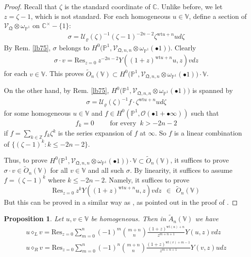 \documentclass[11pt,b5paper,notitlepage]{article}
\theoremstyle{definition}
\theoremstyle{plain}
\newtheorem{pp}[df]{Proposition}
\newcommand{\mc}{\mathcal}
\newcommand{\wtd}{\widetilde}
\newcommand{\Res}{\mathrm{Res}}
\newcommand{\SV}{\mathscr{V}}
\newcommand{\scr}{\mathscr}
\newcommand{\blt}{\bullet}
\newcommand{\Vbb}{\mathbb V}
\newcommand{\Cbb}{\mathbb C}
\newcommand{\Zbb}{\mathbb Z}
\newcommand{\Pbb}{\mathbb P}
\newcommand{\wt}{\mathrm{wt}}
\newcommand{\<}{\left\langle}
\renewcommand{\>}{\right\rangle}
\newcommand{\MU}{\mathcal{U}}
\newcommand{\fq}{{\mathfrak Q}}
\numberwithin{equation}{section}
\begin{document}
\begin{proof}
Recall that $\zeta$ is the standard coordinate of $\Cbb$. Unlike before, we let $z=\zeta-1$, which is not standard. For each homogeneous $u\in\Vbb$, define a section of $\scr V_\fq\otimes\omega_{\Pbb^1}$ on $\Cbb^\times-\{1\}$:
\begin{align}
\sigma=\MU_\varrho(\zeta)^{-1}(\zeta-1)^{-2n-2}\zeta^{\wt u+n}u d\zeta
\end{align}
By Rem. \ref{lb75}, $\sigma$ belongs to $H^0\big(\Pbb^1, \SV_{\fq,n,n}\otimes \omega_{\Pbb^1}(\bullet 1)\big)$. Clearly
\begin{align}
\sigma\cdot v=\Res_{z=0}~z^{-2n-2}Y((1+z)^{\wt u+n}u,z)vdz
\end{align}
for each $v\in\Vbb$. This proves $\wtd O_n(\Vbb)\subset H^0\big(\Pbb^1, \SV_{\fq,n,n}\otimes \omega_{\Pbb^1}(\bullet 1)\big)\cdot\Vbb$.



On the other hand, by Rem. \ref{lb75}, $H^0\big(\Pbb^1, \SV_{\fq,n,n}\otimes \omega_{\Pbb^1}(\bullet 1)\big)$ is spanned by
\begin{align*}
\sigma= \MU_\varrho(\zeta)^{-1} f\cdot\zeta^{\wt u+n}u d\zeta
\end{align*}
for some homogeneous $u\in \Vbb$ and $f\in H^0(\Pbb^1,\mc O(\blt 1+\blt\infty))$ such that 
\begin{align}
f_k=0\qquad \text{ for every } ~k>-2n-2
\end{align}
if $f=\sum_{k\in\Zbb}f_k\zeta^k$ is the series expansion of $f$ at $\infty$. So $f$ is a linear combination of $\{(\zeta-1)^k:k\leq -2n-2\}$. 

Thus, to prove $H^0\big(\Pbb^1, \SV_{\fq,n,n}\otimes \omega_{\Pbb^1}(\bullet 1)\big)\cdot\Vbb\subset\wtd O_n(\Vbb)$, it suffices to prove $\sigma\cdot v\in\wtd O_n(\Vbb)$ for all $v\in\Vbb$ and all such $\sigma$. By linearity, it suffices to assume $f=(\zeta-1)^k$ where $k\leq -2n-2$. Namely, it suffices to prove
    \begin{equation*}
    \Res_{z=0} ~z^k Y((1+z)^{\wt u+n}u,z)vdz ~~ \in ~~\wtd O_n(\Vbb)
    \end{equation*}
But this can be proved in a similar way as \cite[Lem. 2.1.2]{Zhu-modular-invariance}, as pointed out in the proof of \cite[Lem. 2.1]{DLM-Zhu}.
\end{proof}



\begin{pp}
Let $u,v\in\Vbb$ be homogeneous. Then in $\wtd A_n(\Vbb)$ we have
\begin{subequations}
\begin{gather}
u\diamond_L v=\Res_{z=0}\sum_{m=0}^n (-1)^m \binom{m+n}{n}\frac{(1+z)^{\wt(u)+n}}{z^{m+n+1}}Y(u,z)v dz \label{eq163}\\
u\diamond_R v=\Res_{z=0}\sum_{m=0}^n (-1)^n \binom{m+n}{n}\frac{(1+z)^{\wt(v)+m-1}}{z^{m+n+1}}Y(v,z)u dz  \label{eq164}
\end{gather}
\end{subequations}
\end{pp}
\end{document}

